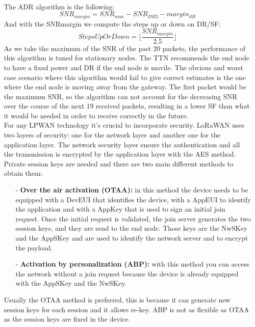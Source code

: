 \\
The ADR algorithm is the following:
\[
SNR_{margin} = SNR_{max} - SNR_{DR3} - margin_{dB}
\]
And with the SNRmargin we compute the steps up or down on DR/SF:
\[
Steps Up Or Down = \lfloor\frac{SNR_{margin}}{2.5}\rfloor
\]
As we take the maximum of the SNR of the past 20 packets, the 
performance of this algorithm is tuned for stationary nodes.
The TTN recommends the end node to have a fixed power and DR if the 
end node is movile. The obvious and worst case scenario where this algorithm would fail 
to give correct estimates is the one where the end node is moving away from 
the gateway. The first packet would be the maximum SNR, so the algorithm can not 
account for the decreasing SNR over the course of the next 19 received packets, 
resulting in a lower SF than what it would be needed in order to receive correctly 
in the future.\\



For any LPWAN technology it's crucial to incorporate security.
LoRaWAN uses two layers of security: one for the network layer and
another one for the application layer. The network security layer ensure
the authentication and all the transmission is encrypted by the
application layer with the AES method. Private session keys are needed
and there are two main different methods to obtain them:
\begin{itemize}
    \item[-] {\bfseries Over the air activation (OTAA):} in this method the device needs
to be equipped with a DevEUI that identifies the device, with a
AppEUI to identify the application and with a AppKey that is used
to sign an initial join request. Once the initial request is validated,
the join server generates the two session keys, and they are send
to the end node. Those keys are the NwSKey and the AppSKey
and are used to identify the network server and to encrypt the
payload.
    \item[-] {\bfseries Activation by personalization (ABP):} with this method you can
access the network without a join request because the device is
already equipped with the AppSKey and the NwSKey.
\end{itemize}
Usually the OTAA method is preferred, this is because it can generate
new session keys for each session and it allows re-key. ABP is not as
flexible as OTAA as the session keys are fixed in the device.
